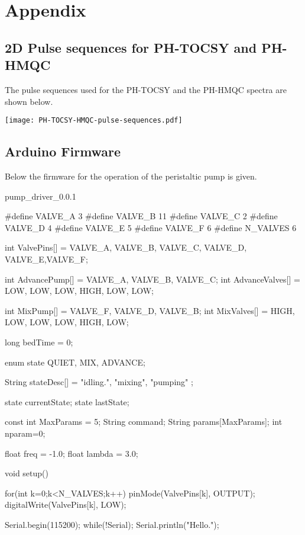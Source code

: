 

\chapter{Appendix} \label{Chapter:Appendix}

\section{2D Pulse sequences for PH-TOCSY and PH-HMQC}

The pulse sequences used for the PH-TOCSY and the PH-HMQC spectra are shown below.

\begin{center}
  \texttt{[image: PH-TOCSY-HMQC-pulse-sequences.pdf]}
\end{center}



\section{Arduino Firmware}

Below the firmware for the operation of the peristaltic pump is given.

pump_driver_0.0.1

#define VALVE_A 3
#define VALVE_B 11
#define VALVE_C 2
#define VALVE_D 4
#define VALVE_E 5
#define VALVE_F 6
#define N_VALVES 6

int ValvePins[] = {VALVE_A, VALVE_B, VALVE_C, VALVE_D, VALVE_E,VALVE_F};

int AdvancePump[] = {VALVE_A, VALVE_B, VALVE_C};
int AdvanceValves[] = {LOW, LOW, LOW, HIGH, LOW, LOW};

int MixPump[] = {VALVE_F, VALVE_D, VALVE_B};
int MixValves[] = {HIGH, LOW, LOW, LOW, HIGH, LOW};


long bedTime = 0;


enum state  {QUIET, MIX, ADVANCE};

String stateDesc[] = {"idling.", "mixing", "pumping"} ;

state currentState;
state lastState;

const int MaxParams = 5;
String command;
String params[MaxParams];
int nparam=0;

float  freq = -1.0;
float lambda = 3.0;

void setup() {

  for(int k=0;k<N_VALVES;k++)
    {
      pinMode(ValvePins[k], OUTPUT);
      digitalWrite(ValvePins[k], LOW);
    }

   Serial.begin(115200);
   while(!Serial);
   Serial.println("Hello.");
}

